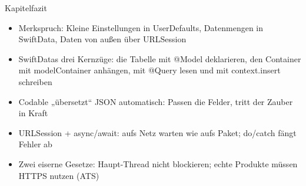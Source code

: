 \begin{tcbsummary}{Kapitelfazit}
\begin{itemize}
  \item Merkspruch: Kleine Einstellungen in UserDefaults, Datenmengen in SwiftData, Daten von außen über URLSession
  \item SwiftDatas drei Kernzüge: die Tabelle mit @Model deklarieren, den Container mit modelContainer anhängen, mit @Query lesen und mit context.insert schreiben
  \item Codable „übersetzt“ JSON automatisch: Passen die Felder, tritt der Zauber in Kraft
  \item URLSession + async/await: aufs Netz warten wie aufs Paket; do/catch fängt Fehler ab
  \item Zwei eiserne Gesetze: Haupt-Thread nicht blockieren; echte Produkte müssen HTTPS nutzen (ATS)
\end{itemize}

\end{tcbsummary}
